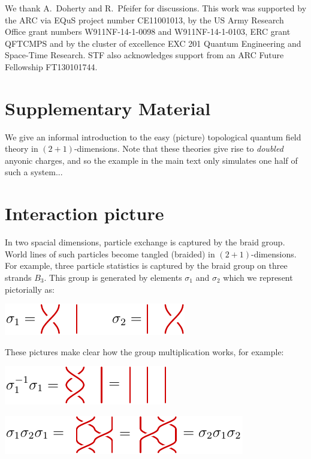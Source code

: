 \documentclass[aps, prl, letterpaper, twocolumn, superscriptaddress, notitlepage, 10pt]{revtex4-1}
\begin{document}
\acknowledgments 

We thank A.\ Doherty and R.\ Pfeifer for discussions. 
This work was supported by the ARC via EQuS project number CE11001013, by the US Army Research Office grant numbers W911NF-14-1-0098 and W911NF-14-1-0103, ERC grant QFTCMPS and by the cluster of excellence EXC 201 Quantum Engineering and Space-Time Research. STF also acknowledges support from an ARC Future Fellowship FT130101744.


\appendix

\section*{Supplementary Material}

We give an informal introduction to
the easy (picture) topological quantum
field theory in $(2+1)$-dimensions.
Note that these theories give rise to
\emph{doubled} anyonic charges, and so
the example in the main text only simulates
one half of such a system...

\section{Interaction picture}

In two spacial dimensions, particle exchange is
captured by the braid group.
World lines of such particles 
become tangled (braided) in $(2+1)$-dimensions.
For example, three particle statistics is captured
by the braid group on three strands $B_3.$
This group is generated by elements $\sigma_1$
and $\sigma_2$ which we represent pictorially as:
\begin{center}
\includegraphics[]{pic-braid-group.pdf}
\end{center}

These pictures make clear how the group
multiplication works, for example:
\begin{center}
\includegraphics[]{pic-braid-group-1.pdf}
\end{center}
\begin{center}
\includegraphics[]{pic-braid-relation.pdf}
\end{center}
\end{document}
